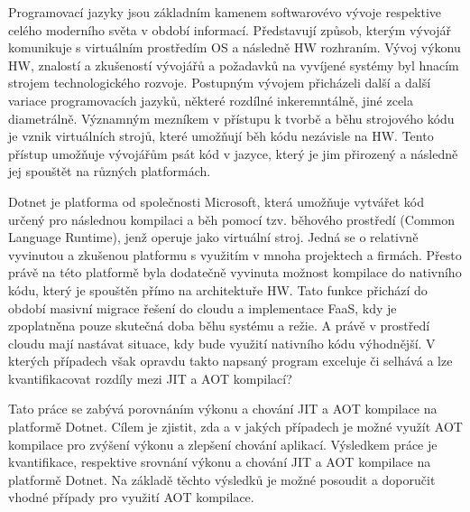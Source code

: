 Programovací jazyky jsou základním kamenem softwarovévo vývoje respektive celého moderního světa v období informací. Představují způsob, kterým vývojář komunikuje s virtuálním prostředím OS a následně HW rozhraním. Vývoj výkonu HW, znalostí a zkušeností vývojářů a požadavků na vyvíjené systémy byl hnacím strojem technologického rozvoje. Postupným vývojem přicházeli další a další variace programovacích jazyků, některé rozdílné inkeremntálně, jiné zcela diametrálně. Významným mezníkem v přístupu k tvorbě a běhu strojového kódu je vznik virtuálních strojů, které umožňují běh kódu nezávisle na HW. Tento přístup umožňuje vývojářům psát kód v jazyce, který je jim přirozený a následně jej spouštět na různých platformách.

Dotnet je platforma od společnosti Microsoft, která umožňuje vytvářet kód určený pro následnou kompilaci a běh pomocí tzv. běhového prostředí (Common Language Runtime), jenž operuje jako virtuální stroj. Jedná se o relativně vyvinutou a zkušenou platformu s využitím v mnoha projektech a firmách. Přesto právě na této platformě byla dodatečně vyvinuta možnost kompilace do nativního kódu, který je spouštěn přímo na architektuře HW. Tato funkce přichází do období masivní migrace řešení do cloudu a implementace FaaS, kdy je zpoplatněna pouze skutečná doba běhu systému a režie. A právě v prostředí cloudu mají nastávat situace, kdy bude využití nativního kódu výhodnější. V kterých případech však opravdu takto napsaný program exceluje či selhává a lze kvantifikacovat rozdíly mezi JIT a AOT kompilací?

Tato práce se zabývá porovnáním výkonu a chování JIT a AOT kompilace na platformě Dotnet. Cílem je zjistit, zda a v jakých případech je možné využít AOT kompilace pro zvýšení výkonu a zlepšení chování aplikací. Výsledkem práce je kvantifikace, respektive srovnání výkonu a chování JIT a AOT kompilace na platformě Dotnet. Na základě těchto výsledků je možné posoudit a doporučit vhodné případy pro využití AOT kompilace.